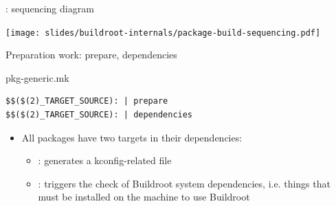 \begin{frame}{: sequencing diagram}

\begin{center}
  \texttt{[image: slides/buildroot-internals/package-build-sequencing.pdf]}
\end{center}

\end{frame}

\begin{frame}[fragile]{Preparation work: prepare, dependencies}

  \begin{block}{pkg-generic.mk}
    \begin{verbatim}
$$($(2)_TARGET_SOURCE): | prepare
$$($(2)_TARGET_SOURCE): | dependencies
    \end{verbatim}
  \end{block}

  \begin{itemize}
  \item All packages have two targets in their dependencies:
    \begin{itemize}
    \item {}: generates a kconfig-related 
      file
    \item {}: triggers the check of Buildroot system
      dependencies, i.e. things that must be installed on the machine
      to use Buildroot
    \end{itemize}
  \end{itemize}
\end{frame}

